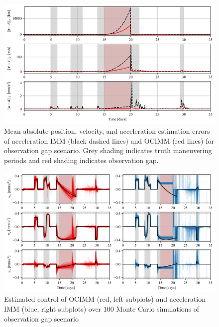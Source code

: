 \documentclass[letterpaper, preprint, paper,11pt]{AAS}	%
\begin{document}
\begin{figure}
    \centering
    \includegraphics[width=1\linewidth]{Figures/MAE_gap.png}
    \caption{Mean absolute position, velocity, and acceleration estimation errors of acceleration IMM (black dashed lines) and OCIMM (red lines) for observation gap scenario. Grey shading indicates truth maneuvering periods and red shading indicates observation gap.}
    \label{fig:MAE-gap}
\end{figure}

\begin{figure}
    \centering
    \includegraphics[width=1\linewidth]{Figures/control.png}
    \caption{Estimated control of OCIMM (red, left subplots) and acceleration IMM (blue, right subplots) over 100 Monte Carlo simulations of observation gap scenario}
    \label{fig:control}
\end{figure}
\end{document}
